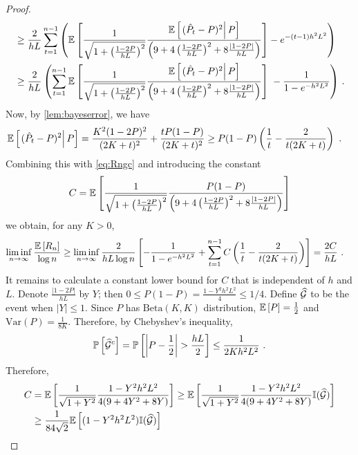 \begin{proof}
\begin{align}
	& \ge \frac{2}{hL}\sum_{t=1}^{n-1} \left( \mathbb{E}\left[ \frac{1}{\sqrt{1+\left( \frac{1-2P}{hL}\right)^2 }}\frac{\mathbb{E}\left[ \left.  ( \hat{P}_{t} - P )^2  \right| P \right]}{ \left(9+ 4\left( \frac{1-2P}{hL}\right)^2 +8 \frac{|1-2P|}{hL} \right)}   \right] - e^{-(t-1)h^2L^2} \right) \nonumber \\
	& \ge \frac{2}{hL}\left(\sum_{t=1}^{n-1} \mathbb{E}\left[ \frac{1}{\sqrt{1+\left( \frac{1-2P}{hL}\right)^2 }}\frac{\mathbb{E}\left[ \left.  ( \hat{P}_{t} - P )^2  \right| P \right]}{ \left(9+ 4\left( \frac{1-2P}{hL}\right)^2 +8 \frac{|1-2P|}{hL} \right)}   \right]  \; -  \frac{1}{1-e^{-h^2L^2}} \right)\,. \label{eq:Rngc}
	\end{align} 
	Now, by \cref{lem:bayeserror}, we have
	\begin{align*}
	\mathbb{E}\left[ \left.  ( \hat{P}_{t} - P )^2  \right| P \right] & = \frac{K^2(1-2P)^2}{(2K+t)^2} + \frac{tP(1-P)}{(2K+t)^2} \ge P(1-P) \left( \frac{1}{t} - \frac{2}{t(2K+t)} \right)~. 
	\end{align*}
	Combining this with \eqref{eq:Rngc} and introducing the constant
	\[
	C = \mathbb{E}\left[ \frac{1}{\sqrt{1+\left( \frac{1-2P}{hL}\right)^2 }}\frac{P(1-P)}{ \left(9+ 4\left( \frac{1-2P}{hL}\right)^2 +8 \frac{|1-2P|}{hL} \right)}   \right] 
	\]
	we obtain, for any $K>0$,
	\begin{align}
	\liminf_{n \to \infty} \frac{\mathbb{E}\left[ R_n \right]}{\log n} & \ge \liminf_{n \to \infty} \frac{2}{hL \log n}\left[ - \frac{1}{1-e^{-h^2L^2}} + \sum_{t=1}^{n-1} C\left(\frac{1}{t} - \frac{2}{t(2K+t)} \right) \right]
	 = \frac{2 C}{hL}~.
	\end{align}
	It remains to calculate a constant lower bound for $C$ that is independent of $h$ and $L$. Denote $\frac{|1-2P|}{hL}$ by $Y$; then $0\le P(1-P) = \frac{1-Y^2h^2L^2}{4}\le 1/4$. Define $\widehat{\mathcal{G}}$ to be the event when 
	$|Y| \le 1$. Since $P$ has $\mbox{Beta}(K,K)$ distribution, $\mathbb{E}\left[ P \right] = \frac{1}{2}$ and $\mbox{Var}(P) = \frac{1}{8K}$. Therefore, by Chebyshev's inequality,
	\begin{align*}
	\mathbb{P}\left[\widehat{\mathcal{G}}^c\right] = \mathbb{P}\left[ \left| P-\frac{1}{2}\right| > \frac{hL}{2} \right] \le \frac{1}{2 K h^2 L^2}~.
	\end{align*}
Therefore,
	\begin{align*}
	C &= \Exp{\frac{1}{\sqrt{1+Y^2 }}\frac{1-Y^2h^2L^2}{ 4 (9+ 4Y^2 +8 Y )}}
	 \ge \Exp{\frac{1}{\sqrt{1+Y^2 }}\frac{1-Y^2h^2L^2}{ 4 (9+ 4Y^2 +8 Y )} \ind(\widehat{\cG}) } \\
	& \ge \frac{1}{84\sqrt{2}}\Exp{(1-Y^2h^2L^2)\ind(\widehat{\cG})} 

\end{align*}
\end{proof}

